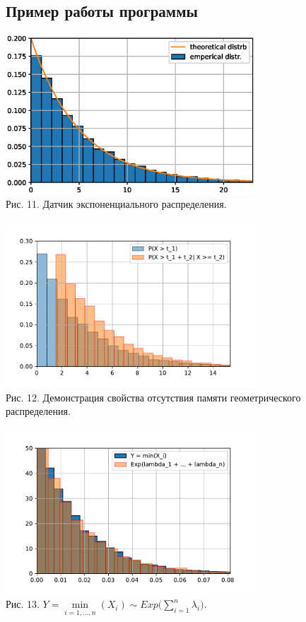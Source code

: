 \documentclass[11pt]{article}
\begin{document}
\subsection{Пример работы программы}
\begin{center}
	\includegraphics[width=0.7\textwidth]{3_1.eps}\\
	{Рис. 11. Датчик экспоненциального распределения. }
\end{center}
\begin{center}
	\includegraphics[width=0.7\textwidth]{3_2.pdf}\\
	{Рис. 12. Демонстрация свойства отсутствия памяти геометрического распределения. }
\end{center}
\begin{center}
	\includegraphics[width=0.7\textwidth]{3_3.pdf}\\
	{Рис. 13.  $Y = \underset{i = 1,\dots,n}{\min}(X_i) \sim Exp\big( \sum_{i = 1}^{n} \lambda_i \big)$. }
\end{center}
\end{document}
